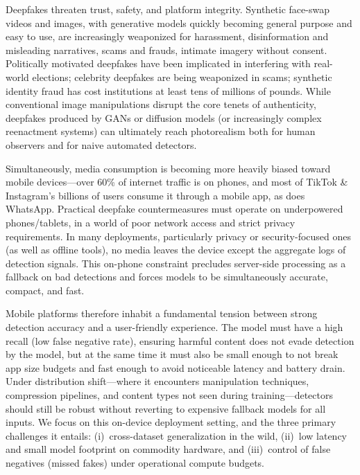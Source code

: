 Deepfakes threaten trust, safety, and platform integrity. Synthetic face\hyp swap videos and images, with generative models quickly becoming general purpose and easy to use, are increasingly weaponized for harassment, disinformation and misleading narratives, scams and frauds, intimate imagery without consent. Politically motivated deepfakes have been implicated in interfering with real\hyp world elections; celebrity deepfakes are being weaponized in scams; synthetic identity fraud has cost institutions at least tens of millions of pounds. While conventional image manipulations disrupt the core tenets of authenticity, deepfakes produced by GANs or diffusion models (or increasingly complex reenactment systems) can ultimately reach photorealism both for human observers and for naive automated detectors.

Simultaneously, media consumption is becoming more heavily biased toward mobile devices---over 60\% of internet traffic is on phones, and most of TikTok \& Instagram's billions of users consume it through a mobile app, as does WhatsApp. Practical deepfake countermeasures must operate on underpowered phones/tablets, in a world of poor network access and strict privacy requirements. In many deployments, particularly privacy or security\hyp focused ones (as well as offline tools), no media leaves the device except the aggregate logs of detection signals. This on\hyp phone constraint precludes server\hyp side processing as a fallback on bad detections and forces models to be simultaneously accurate, compact, and fast.

Mobile platforms therefore inhabit a fundamental tension between strong detection accuracy and a user\hyp friendly experience. The model must have a high recall (low false negative rate), ensuring harmful content does not evade detection by the model, but at the same time it must also be small enough to not break app size budgets and fast enough to avoid noticeable latency and battery drain. Under distribution shift---where it encounters manipulation techniques, compression pipelines, and content types not seen during training---detectors should still be robust without reverting to expensive fallback models for all inputs. We focus on this on\hyp device deployment setting, and the three primary challenges it entails: (i)~cross\hyp dataset generalization in the wild, (ii)~low latency and small model footprint on commodity hardware, and (iii)~control of false negatives (missed fakes) under operational compute budgets.

